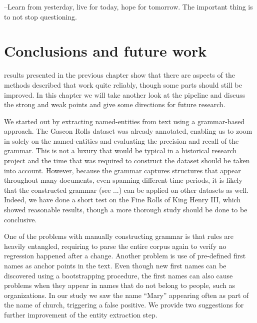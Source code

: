 \begin{savequote}[75mm] 
--Learn from yesterday, live for today, hope for tomorrow. The important thing is to not stop questioning.
\end{savequote}




\chapter{Conclusions and future work}
\label{ch:conclusions}

 results presented in the previous chapter show that there are aspects of the methods described that work quite reliably, though some parts should still be improved.
In this chapter we will take another look at the pipeline and discuss the strong and weak points and give some directions for future research.

We started out by extracting named-entities from text using a grammar-based approach.
The Gascon Rolls dataset was already annotated, enabling us to zoom in solely on the named-entities and evaluating the precision and recall of the grammar.
This is not a luxury that would be typical in a historical research project and the time that was required to construct the dataset should be taken into account.
However, because the grammar captures structures that appear throughout many documents, even spanning different time periods, it is likely that the constructed grammar (see ...) can be applied on other datasets as well.
Indeed, we have done a short test on the Fine Rolls of King Henry III, which showed reasonable results, though a more thorough study should be done to be conclusive.

One of the problems with manually constructing grammar is that rules are heavily entangled, requiring to parse the entire corpus again to verify no regression happened after a change.
Another problem is use of pre-defined first names as anchor points in the text.
Even though new first names can be discovered using a bootstrapping procedure, the first names can also cause problems when they appear in names that do not belong to people, such as organizations.
In our study we saw the name ``Mary'' appearing often as part of the name of church, triggering a false positive.
We provide two suggestions for further improvement of the entity extraction step.


